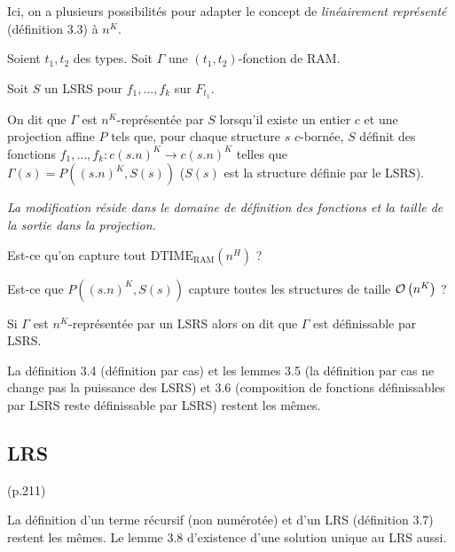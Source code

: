 \documentclass{report}
\newcommand{\dtimeram}{\text{DTIME}_{\text{RAM}}\left( n^H \right)}
\begin{document}
		
		Ici, on a plusieurs possibilités pour adapter le concept de \emph{linéairement représenté} (définition 3.3) à $n^K$.
		
		\begin{definition}
			\label{def:representee_par_LSRS}
			Soient $t_1, t_2$ des types. Soit $\Gamma$ une $(t_1, t_2)$-fonction de RAM.
			
			
			Soit $S$ un LSRS pour $f_1, \dots, f_k$ sur $F_{t_1}$. 
			
			On dit que $\Gamma$ est $n^K$-représentée par $S$ lorsqu'il existe un entier $c$ et une projection affine $P$ tels que, pour chaque structure $s$ $c$-bornée, $S$ définit des fonctions $f_1, \dots, f_k : c (s.n)^K \to c (s.n)^K$ telles que $\Gamma(s) = P((s.n)^K, S(s))$ ($S(s)$ est la structure définie par le LSRS).
			
			\emph{La modification réside dans le domaine de définition des fonctions et la taille de la sortie dans la projection.}
		\end{definition}
			
		
		\begin{prob}
			Est-ce qu'on capture tout $\dtimeram$ ? 
		\end{prob}
		
		\begin{prob}
			Est-ce que $P((s.n)^K, S(s))$ capture toutes les structures de taille $\mathcal{O}\left( n^K \right)$ ?
		\end{prob}
			
	
		Si $\Gamma$ est $n^K$-représentée par un LSRS alors on dit que $\Gamma$ est définissable par LSRS. 
		
		
		
		La définition 3.4 (définition par cas) et les lemmes 3.5 (la définition par cas ne change pas la puissance des LSRS) et 3.6 (composition de fonctions définissables par LSRS reste définissable par LSRS) restent les mêmes.
		
		
		\subsection{LRS} (p.211)
			\label{subsec:LRS}
		
		
		La définition d'un terme récursif (non numérotée) et d'un LRS (définition 3.7) restent les mêmes. Le lemme 3.8 d'existence d'une solution unique au LRS aussi. 
		
\end{document}
